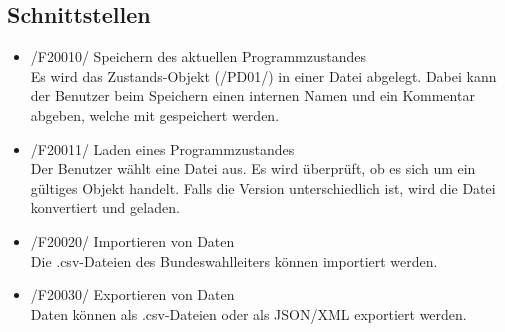 \documentclass[10pt,a4paper]{article}
\begin{document}
\subsection{Schnittstellen}
\begin{itemize}
	\item /F20010/ Speichern des aktuellen Programmzustandes \hfill \\
	Es wird das Zustands-Objekt (/PD01/) in einer Datei abgelegt. Dabei kann der Benutzer beim Speichern einen internen Namen und ein Kommentar abgeben, welche mit gespeichert werden.
	\item /F20011/ Laden eines Programmzustandes \hfill \\
	Der Benutzer wählt eine Datei aus. Es wird überprüft, ob es sich um ein gültiges Objekt handelt. Falls die Version unterschiedlich ist, wird die Datei konvertiert und geladen.
	\item /F20020/ Importieren von Daten \hfill \\
	Die .csv-Dateien des Bundeswahlleiters können importiert werden.
	\item /F20030/ Exportieren von Daten \hfill \\
	Daten können als .csv-Dateien oder als JSON/XML exportiert werden.
	

\end{itemize}
\end{document}
